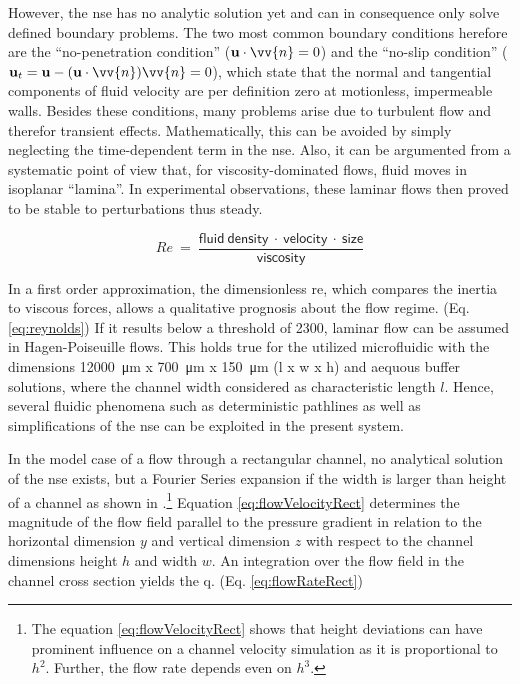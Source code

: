 However, the \gls{nse} has no analytic solution yet and can in consequence only solve defined boundary problems. The two most common boundary conditions herefore are the ``no-penetration condition'' ($\mathbf{u} \cdot \vv{n} = 0$) and the ``no-slip condition'' ($\mathbf{u}_t = \mathbf{u} - (\mathbf{u}\cdot \vv{n}) \vv{n} = 0$), which state that the normal and tangential components of fluid velocity are per definition zero at motionless, impermeable walls.\newline
Besides these conditions, many problems arise due to turbulent flow and therefor transient effects. Mathematically, this can be avoided by simply neglecting the time-dependent term in the \gls{nse}. Also, it can be argumented from a systematic point of view that, for viscosity-dominated flows, fluid moves in isoplanar ``lamina''. In experimental observations, these laminar flows then proved to be stable to perturbations thus steady.

\begin{equation}
	\mathit{Re}\ =\ \frac{\mathrm{\mathsf{fluid\ density\ \cdot\ velocity\ \cdot\ size}}}{\mathrm{\mathsf{viscosity}}} \label{eq:reynolds}
\end{equation}

In a first order approximation, the dimensionless \gls{re}, which compares the inertia to viscous forces, allows a qualitative prognosis about the flow regime. (Eq. \ref{eq:reynolds}) If it results below a threshold of 2300, laminar flow can be assumed in Hagen-Poiseuille flows. This holds true for the utilized microfluidic with the dimensions \SI{12000}{\micro\meter} x \SI{700}{\micro\meter} x \SI{150}{\micro\meter} (l x w x h) and aequous buffer solutions, where the channel width considered as characteristic length $l$. Hence, several fluidic phenomena such as deterministic pathlines as well as simplifications of the \gls{nse} can be exploited in the present system. 

In the model case of a flow through a rectangular channel, no analytical solution of the \gls{nse} exists, but a Fourier Series expansion if the width is larger than height of a channel as shown in \citet{lit:fluidic:bruus}.\footnote{The equation \ref{eq:flowVelocityRect} shows that height deviations can have prominent influence on a channel velocity simulation as it is proportional to $h^2$. Further, the flow rate depends even on $h^3$.} 
Equation \ref{eq:flowVelocityRect} determines the magnitude of the flow field parallel to the pressure gradient in relation to the horizontal dimension $y$ and vertical dimension $z$ with respect to the channel dimensions height $h$ and width $w$. An integration over the flow field in the channel cross section yields the \gls{q}. (Eq. \ref{eq:flowRateRect})

